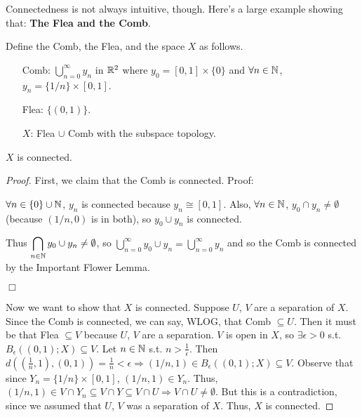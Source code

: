 Connectedness is not always intuitive, though. Here's a large example showing that: \textbf{The Flea and the Comb}.

Define the Comb, the Flea, and the space $X$ as follows. 
\begin{itemize}
\item[Comb:] ${\displaystyle\bigcup_{n=0}^{\infty}y_n}$ in $\mathbb R^2$ where $y_0 = [0,1]\times\{0\}$ and $\forall n\in \mathbb N$, $y_n = \{1/n\} \times [0,1]$. 
\item[Flea:] $\{(0,1)\}$. 
\item[$X$:] Flea $\cup$ Comb with the subspace topology. 
\end{itemize}
\begin{example}
$X$ is connected. 
\end{example}
\begin{proof}
First, we claim that the Comb is connected. Proof: 

$\forall n \in \{0\} \cup \mathbb N$, $y_n$ is connected because $y_n \cong [0,1]$. Also, $\forall n \in \mathbb N$, $y_0 \cap y_n \neq \emptyset$ (because $(1/n, 0)$ is in both), so $y_0 \cup y_n$ is connected. 

Thus ${\displaystyle\bigcap_{n\in \mathbb N}y_0 \cup y_n} \neq \emptyset$, so ${\displaystyle\bigcup_{n=0}^{\infty}y_0 \cup y_n} = {\displaystyle\bigcup_{n=0}^{\infty}y_n} $ and so the Comb is connected by the Important Flower Lemma. 
\begin{flushright}
$\Box$
\end{flushright}

Now we want to show that $X$ is connected. Suppose $U$, $V$ are a separation of $X$. Since the Comb is connected, we can say, WLOG, that Comb $\subseteq U$. Then it must be that Flea $\subseteq V$ because $U$, $V$ are a separation. $V$ is open in $X$, so $\exists \epsilon > 0$ s.t. $B_{\epsilon}((0,1); X) \subseteq V$. Let $n \in \mathbb N$ s.t. $n > \frac{1}{\epsilon}$. Then $d((\frac{1}{n}, 1), (0, 1)) = \frac{1}{n} < \epsilon \Rightarrow (1/n, 1) \in B_{\epsilon}((0,1); X) \subseteq V$. Observe that since $Y_n = \{1/n\} \times [0,1]$, $(1/n, 1) \in Y_n$. Thus, $(1/n, 1) \in V \cap Y_n \subseteq V \cap Y \subseteq V \cap U \Rightarrow V \cap U \neq \emptyset$. But this is a contradiction, since we assumed that $U$, $V$ was a separation of $X$. Thus, $X$ is connected. 
\end{proof}

